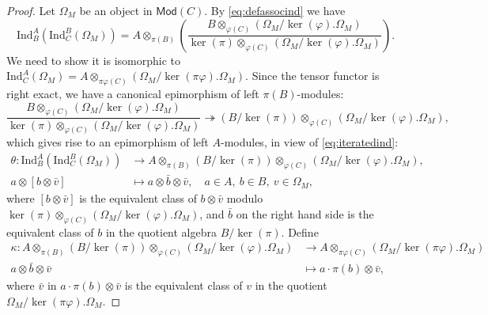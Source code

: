 \documentclass[12pt,a4paper,reqno]{amsart}
\numberwithin{equation}{section}
\numberwithin{equation}{section}
\theoremstyle{definition}
\def \ra {\rightarrow}
\def \ka{\kappa}
\def\Ind{\mathrm{Ind}}
\def\o{\otimes}
\def\Om{\Omega}
\def\Ind{\mathrm{Ind}}
\def\Mod{\mathsf{Mod}}
\begin{document}
	\begin{proof}
		Let $\Om_M$ be an object in $\Mod(C)$. By \eqref{eq:defassocind} we have 
		\begin{equation}\label{eq:iteratedind}
			\Ind^A_B\left(\Ind^B_C(\Om_M)\right)=A\o_{\pi(B)}\left(\frac{B\o_{\varphi(C)}(\Om_M/\ker(\varphi).\Om_M)}{\ker(\pi)\o_{\varphi(C)}(\Om_M/\ker(\varphi).\Om_M)}\right).
		\end{equation}
		We need to show it is isomorphic to $\Ind_C^A(\Om_M)=A\o_{\pi\varphi(C)}(\Om_M/\ker(\pi\varphi).\Om_M)$. Since the tensor functor is right exact, we have a canonical epimorphism of left $\pi(B)$-modules: 
		$$
		\frac{B\o_{\varphi(C)}(\Om_M/\ker(\varphi).\Om_M)}{\ker(\pi)\o_{\varphi(C)}(\Om_M/\ker(\varphi).\Om_M)}\twoheadrightarrow (B/\ker(\pi))\o_{\varphi(C)} (\Om_M/\ker(\varphi).\Om_M),
		$$
		which gives rise to an epimorphism of left $A$-modules, in view of \eqref{eq:iteratedind}: 
		\begin{equation}\label{eq:deftheta}
			\begin{aligned}
				\theta: \Ind^A_B\left(\Ind^B_C(\Om_M)\right)&\ra A\o_{\pi(B)} (B/\ker(\pi))\o_{\varphi(C)} (\Om_M/\ker(\varphi).\Om_M),\\
				a\o [b\o \bar{v}]&\mapsto a\o \bar{b}\o \bar{v},\quad a\in A,\ b\in B,\ v\in \Om_M,
			\end{aligned}
		\end{equation}
		where $[b\o \bar{v}]$ is the equivalent class of $b\o \bar{v}$ modulo $\ker(\pi)\o_{\varphi(C)}(\Om_M/\ker(\varphi).\Om_M)$, and $\bar{b}$ on the right hand side is the equivalent class of $b$ in the quotient algebra  $B/\ker(\pi)$. Define
		\begin{equation}\label{eq:defkappa}
			\begin{aligned}
				\ka: A\o_{\pi(B)} (B/\ker(\pi))\o_{\varphi(C)} (\Om_M/\ker(\varphi).\Om_M)&\ra A\o_{\pi\varphi(C)}(\Om_M/\ker(\pi\varphi).\Om_M)\\
				a\o \bar{b}\o \bar{v}&\mapsto a\cdot \pi(b)\o \bar{v},
			\end{aligned}
		\end{equation}
		where $\bar{v}$ in $a\cdot \pi(b)\o\bar{v}$ is the equivalent class of $v$ in the quotient $\Om_M/\ker(\pi\varphi).\Om_M$. 
		

\end{proof}
\end{document}

